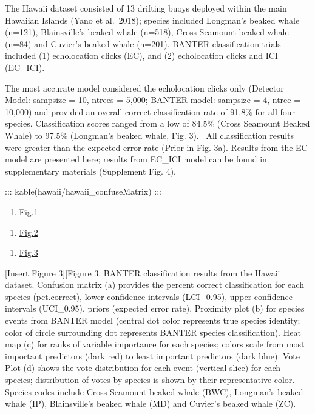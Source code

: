 \documentclass[
  letterpaper,
  DIV=11,
  numbers=noendperiod]{scrartcl}
\providecommand{\tightlist}{%
  \setlength{\itemsep}{0pt}\setlength{\parskip}{0pt}}\usepackage{longtable,booktabs,array}
\begin{document}
The Hawaii dataset consisted of 13 drifting buoys deployed within the
main Hawaiian Islands (Yano et al.~2018); species included Longman's
beaked whale (n=121), Blainsville's beaked whale (n=518), Cross Seamount
beaked whale (n=84) and Cuvier's beaked whale (n=201). BANTER
classification trials included (1) echolocation clicks (EC), and (2)
echolocation clicks and ICI (EC\_ICI).

The most accurate model considered the echolocation clicks only
(Detector Model: sampsize = 10, ntrees = 5,000; BANTER model: sampsize =
4, ntree = 10,000) and provided an overall correct classification rate
of 91.8\% for all four species. Classification scores ranged from a low
of 84.5\% (Cross Seamount Beaked Whale) to 97.5\% (Longman's beaked
whale, Fig. 3). ~All classification results were greater than the
expected error rate (Prior in Fig. 3a). Results from the EC model are
presented here; results from EC\_ICI model can be found in supplementary
materials (Supplement Fig. 4).

::: kable(hawaii/hawaii\_confuseMatrix) :::

\begin{enumerate}
\def\labelenumi{\alph{enumi})}
\tightlist
\item
  \href{hawaii/hawaii_proximity.png}{Fig.1}
\end{enumerate}

\begin{enumerate}
\def\labelenumi{\alph{enumi})}
\setcounter{enumi}{1}
\tightlist
\item
  \href{hawaii/hawaii_importance.png}{Fig.2}
\end{enumerate}

\begin{enumerate}
\def\labelenumi{\alph{enumi})}
\setcounter{enumi}{2}
\tightlist
\item
  \href{hawaii/hawaii_votes.png}{Fig.3}
\end{enumerate}

{[}Insert Figure 3{]}{[}Figure 3. BANTER classification results from the
Hawaii dataset. Confusion matrix (a) provides the percent correct
classification for each species (pct.correct), lower confidence
intervals (LCI\_0.95), upper confidence intervals (UCI\_0.95), priors
(expected error rate). Proximity plot (b) for species events from BANTER
model (central dot color represents true species identity; color of
circle surrounding dot represents BANTER species classification). Heat
map (c) for ranks of variable importance for each species; colors scale
from most important predictors (dark red) to least important predictors
(dark blue). Vote Plot (d) shows the vote distribution for each event
(vertical slice) for each species; distribution of votes by species is
shown by their representative color. Species codes include Cross
Seamount beaked whale (BWC), Longman's beaked whale (IP), Blainsville's
beaked whale (MD) and Cuvier's beaked whale (ZC).
\end{document}
